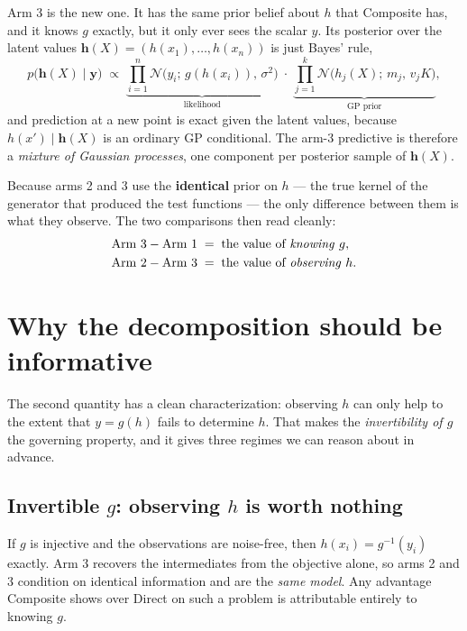 \documentclass[11pt]{article}
\newcommand{\Norm}{\mathcal{N}}
\begin{document}
Arm 3 is the new one. It has the same prior belief about $h$ that Composite
has, and it knows $g$ exactly, but it only ever sees the scalar $y$. Its
posterior over the latent values $\mathbf{h}(X)=(h(x_1),\dots,h(x_n))$ is
just Bayes' rule,
\begin{equation}
p\bigl(\mathbf{h}(X)\mid \mathbf{y}\bigr)\;\propto\;
\underbrace{\prod_{i=1}^{n}\Norm\!\bigl(y_i;\,g(h(x_i)),\,\sigma^2\bigr)}_{\text{likelihood}}
\;\cdot\;
\underbrace{\prod_{j=1}^{k}\Norm\!\bigl(h_j(X);\,m_j,\,v_jK\bigr)}_{\text{GP prior}} ,
\label{eq:posterior}
\end{equation}
and prediction at a new point is exact given the latent values, because
$h(x')\mid \mathbf{h}(X)$ is an ordinary GP conditional. The arm-3 predictive is
therefore a \emph{mixture of Gaussian processes}, one component per posterior
sample of $\mathbf{h}(X)$.

Because arms 2 and 3 use the \textbf{identical} prior on $h$ --- the true kernel
of the generator that produced the test functions --- the only difference
between them is what they observe. The two comparisons then read cleanly:
\begin{align}
\text{Arm 3} - \text{Arm 1} &\;=\; \text{the value of \emph{knowing} } g, \\
\text{Arm 2} - \text{Arm 3} &\;=\; \text{the value of \emph{observing} } h .
\end{align}

\section{Why the decomposition should be informative}

The second quantity has a clean characterization: observing $h$ can only help
to the extent that $y=g(h)$ fails to determine $h$. That makes the
\emph{invertibility of $g$} the governing property, and it gives three regimes
we can reason about in advance.

\subsection{Invertible $g$: observing $h$ is worth nothing}

If $g$ is injective and the observations are noise-free, then
$h(x_i)=g^{-1}(y_i)$ exactly. Arm 3 recovers the intermediates from the
objective alone, so arms 2 and 3 condition on identical information and are the
\emph{same model}. Any advantage Composite shows over Direct on such a problem
is attributable entirely to knowing $g$.
\end{document}
